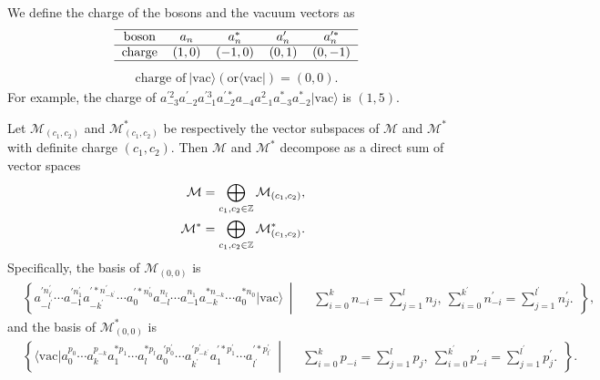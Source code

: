 \documentclass[10pt,a4paper]{amsart}
\numberwithin{equation}{section}
\begin{document}
We define the charge of the bosons and the vacuum vectors as
\begin{eqnarray}
\centering
\begin{tabular}{c c c c c}
\hline
boson & $a_{n}$ & $a_{n}^{*}$ & $a^{\prime}_{n}$ & $a_{n}^{\prime\ast}$ \\
\hline
charge  & $(1,0)$  & $(-1,0)$   & $(0,1)$  & $(0,-1)$  \\
\hline
\end{tabular}
\end{eqnarray}
\begin{eqnarray}
\text{charge of}\ |\text{vac}\rangle(\text{or}\langle\text{vac}|)=(0,0).
\end{eqnarray}
For example, the charge of $a^{\prime2}_{-3}a^{\prime}_{-2}a^{\prime3}_{-1}a^{\prime\ast}_{-2}a_{-4}a^{2}_{-1}
a^{\ast}_{-3}a^{\ast}_{-2}|\text{vac}\rangle$ is $(1,5)$.

Let $\mathcal{M}_{(c_{1},c_{2})}$ and $\mathcal{M}^{\ast}_{(c_{1},c_{2})}$ be respectively the vector subspaces of $\mathcal{M}$ and $\mathcal{M}^{\ast}$ with definite charge $(c_{1},c_{2})$. Then $\mathcal{M}$ and $\mathcal{M}^{\ast}$ decompose as  a direct sum of vector spaces
\begin{eqnarray}
&&\mathcal{M}=\bigoplus\limits_{c_{1},c_{2}\in\mathbb{Z}}\mathcal{M}_{(c_{1},c_{2})},\notag\\
&&\mathcal{M}^{\ast}=\bigoplus\limits_{c_{1},c_{2}\in\mathbb{Z}}\mathcal{M}^{\ast}
_{(c_{1},c_{2})}.
\end{eqnarray}
Specifically, the basis of $\mathcal{M}_{(0,0)}$ is
\begin{align}
&\left\{a_{-l^{\prime}}^{\prime n^{\prime}_{l^{\prime}}}
\cdots a^{\prime n^{\prime}_{1}}_{-1}a^{\prime\ast n^{\prime}_{-k^{\prime}}}_{-k^{\prime}}
\cdots a^{\prime\ast n^{\prime}_{0}}_{0}a_{-l}^{n_{l}}\cdots a_{-1}^{n_{1}}
a^{\ast n_{-k}}_{-k}\cdots a^{\ast n_{0}}_{0}|\text{vac}\rangle\,\middle|\, %
    \begin{aligned}
        & \sum\limits_{i=0}^{k}n_{-i}=\sum\limits_{j=1}^{l}n_{j}, \ \sum\limits_{i=0}^{k^{\prime}}n^{\prime}_{-i}=\sum\limits_{j=1}^{l^{\prime}}n^{\prime}_{j}.
    \end{aligned}\right\},
\end{align}
and the basis of $\mathcal{M}^{\ast}_{(0,0)}$ is
\begin{align}
&\left\{\langle\text{vac}|a^{p_{0}}_{0}\cdots a^{p_{-k}}_{k}
a^{\ast p_{1}}_{1}\cdots a^{\ast p_{l}}_{l}a^{\prime p^{\prime}_{0}}_{0}
\cdots a^{\prime p^{\prime}_{-k^{\prime}}}_{k^{\prime}} a^{\prime\ast p^{\prime}_{1}}_{1}
\cdots a^{\prime\ast p^{\prime}_{l^{\prime}}}_{l^{\prime}}\,\middle|\, %
    \begin{aligned}
        & \sum\limits_{i=0}^{k}p_{-i}=\sum\limits_{j=1}^{l}p_{j},\ \sum\limits_{i=0}^{k^{\prime}}p^{\prime}_{-i}=\sum\limits_{j=1}^{l^{\prime}}p^{\prime}_{j}.
         \end{aligned}\right\}.
\end{align}
\end{document}
